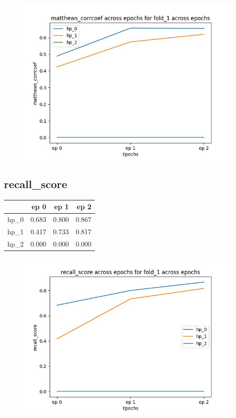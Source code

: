 \documentclass{article}
\begin{document}
\begin{figure}[H]
\includegraphics[scale = 0.75]{fold_1/matthews_corrcoef}
\end{figure}
\subsection{recall\_score}
\begin{tabular}{lrrr}
\toprule
{} &   ep 0 &   ep 1 &   ep 2 \\
\midrule
hp\_0 &  0.683 &  0.800 &  0.867 \\
hp\_1 &  0.417 &  0.733 &  0.817 \\
hp\_2 &  0.000 &  0.000 &  0.000 \\
\bottomrule
\end{tabular}

\begin{figure}[H]
\includegraphics[scale = 0.75]{fold_1/recall_score}
\end{figure}
\end{document}
